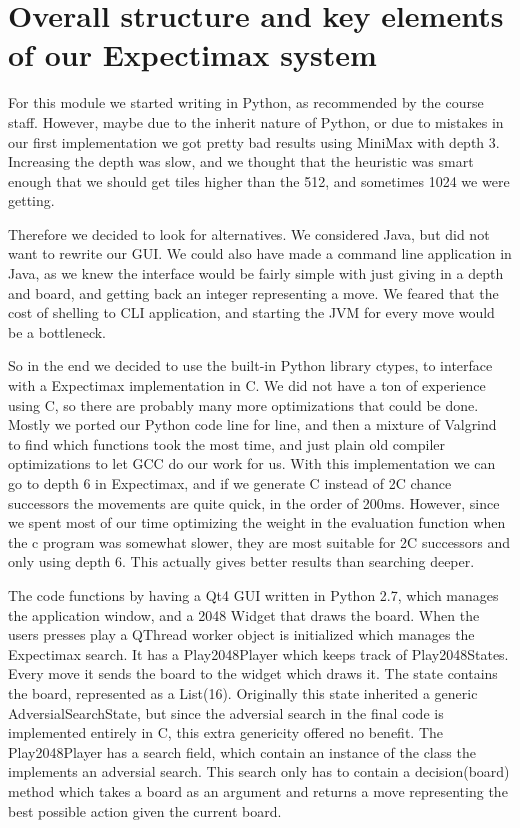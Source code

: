 \section{Overall structure and key elements of our Expectimax system}
For this module we started writing in Python, as recommended by the course
staff. However, maybe due to the inherit nature of Python, or due to mistakes
in our first implementation we got pretty bad results using MiniMax with depth 3.
Increasing the depth was slow, and we thought that the heuristic was smart enough
that we should get tiles higher than the 512, and sometimes 1024 we were getting.

Therefore we decided to look for alternatives. We considered Java, but did not
want to rewrite our GUI. We could also have made a command line application in
Java, as we knew the interface would be fairly simple with just giving in a depth
and board, and getting back an integer representing a move. We feared that the
cost of shelling to CLI application, and starting the JVM for every move would
be a bottleneck.

So in the end we decided to use the built-in Python library ctypes, to interface
with a Expectimax implementation in C. We did not have a ton of experience using
C, so there are probably many more optimizations that could be done. Mostly we
ported our Python code line for line, and then a mixture of Valgrind to find
which functions took the most time, and just plain old compiler optimizations
to let GCC do our work for us. With this implementation we can go to depth 6
in Expectimax, and if we generate C instead of 2C chance successors the
movements are quite quick, in the order of 200ms. However, since we spent most
of our time optimizing the weight in the evaluation function when the c program
was somewhat slower, they are most suitable for 2C successors and only using depth 6.
This actually gives better results than searching deeper.

The code functions by having a Qt4 GUI written in Python 2.7, which
manages the application window, and a 2048 Widget that draws the board.
When the users presses play a QThread worker object is initialized which
manages the Expectimax search. It has a Play2048Player which keeps track of
Play2048States. Every move it sends the board to the widget which draws it.
The state contains the board, represented as a List(16). Originally this
state inherited a generic AdversialSearchState, but since the adversial
search in the final code is implemented entirely in C, this extra
genericity offered no benefit. The Play2048Player has a search field, which
contain an instance of the class the implements an adversial search. This
search only has to contain a decision(board) method which takes a board
as an argument and returns a move representing the best possible action
given the current board.

